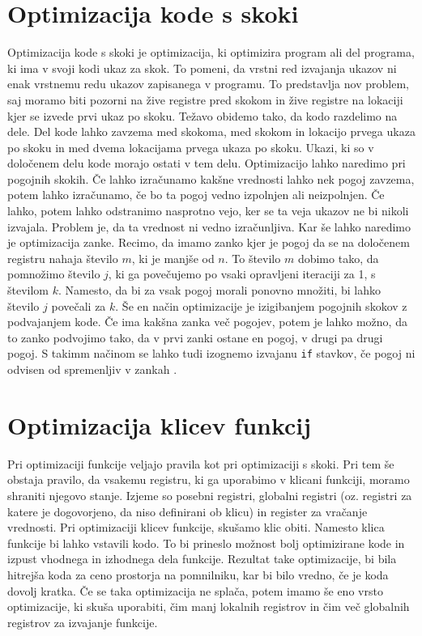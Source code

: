 \documentclass[a4paper, 12pt]{book}
\begin{document}
\section{Optimizacija kode s skoki}
Optimizacija kode s skoki je optimizacija, ki optimizira program ali del programa, ki ima v svoji kodi ukaz za skok. To pomeni, da vrstni red izvajanja ukazov ni enak vrstnemu redu ukazov zapisanega v programu. To predstavlja nov problem, saj moramo biti pozorni na žive registre pred skokom in žive registre na lokaciji kjer se izvede prvi ukaz po skoku. Težavo obidemo tako, da kodo razdelimo na dele. Del kode lahko zavzema med skokoma, med skokom in lokacijo prvega ukaza po skoku in med dvema lokacijama prvega ukaza po skoku. Ukazi, ki so v določenem delu kode morajo ostati v tem delu. Optimizacijo lahko naredimo pri pogojnih skokih. Če lahko izračunamo kakšne vrednosti lahko nek pogoj zavzema, potem lahko izračunamo, če bo ta pogoj vedno izpolnjen ali neizpolnjen. Če lahko, potem lahko odstranimo nasprotno vejo, ker se ta veja ukazov ne bi nikoli izvajala. Problem je, da ta vrednost ni vedno izračunljiva. Kar še lahko naredimo je optimizacija zanke. Recimo, da imamo zanko kjer je pogoj da se na določenem registru nahaja število \(m\), ki je manjše od \(n\). To število \(m\) dobimo tako, da pomnožimo število \(j\), ki ga povečujemo po vsaki opravljeni iteraciji za 1, s številom \(k\). Namesto, da bi za vsak pogoj morali ponovno množiti, bi lahko število \(j\) povečali za \(k\). Še en način optimizacije je izigibanjem pogojnih skokov z podvajanjem kode. Če ima kakšna zanka več pogojev, potem je lahko možno, da to zanko podvojimo tako, da v prvi zanki ostane en pogoj, v drugi pa drugi pogoj. S takimm načinom se lahko tudi izognemo izvajanu \texttt{if} stavkov, če pogoj ni odvisen od spremenljiv v zankah \cite{avoid}.
\section{Optimizacija klicev funkcij}
Pri optimizaciji funkcije veljajo pravila kot pri optimizaciji s skoki. Pri tem še obstaja pravilo, da vsakemu registru, ki ga uporabimo v klicani funkciji, moramo shraniti njegovo stanje. Izjeme so posebni registri, globalni registri (oz. registri za katere je dogovorjeno, da niso definirani ob klicu) in register za vračanje vrednosti. Pri optimizaciji klicev funkcije, skušamo klic obiti. Namesto klica funkcije bi lahko vstavili kodo. To bi prineslo možnost bolj optimizirane kode in izpust vhodnega in izhodnega dela funkcije. Rezultat take optimizacije, bi bila hitrejša koda za ceno prostorja na pomnilniku, kar bi bilo vredno, če je koda dovolj kratka. Če se taka optimizacija ne splača, potem imamo še eno vrsto optimizacije, ki skuša uporabiti, čim manj lokalnih registrov in čim več globalnih registrov za izvajanje funkcije.  
\end{document}
